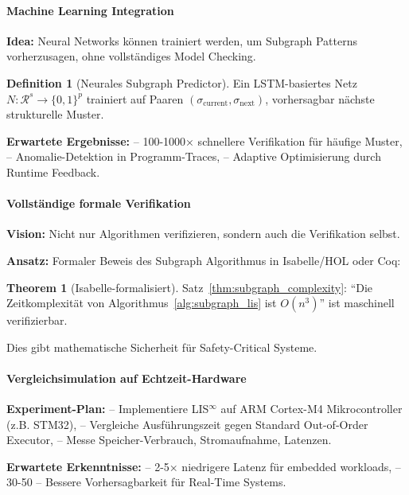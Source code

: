 \documentclass[a4paper,12pt]{article}
\theoremstyle{definition}
\newtheorem{theorem}{Theorem}
\newtheorem{definition}{Definition}
\begin{document}
\paragraph{Machine Learning Integration}

\textbf{Idea:} Neural Networks können trainiert werden, um Subgraph Patterns vorherzusagen, ohne vollständiges Model Checking.

\begin{definition}[Neurales Subgraph Predictor]
	Ein LSTM-basiertes Netz $N: \mathcal{R}^s \to \{0,1\}^p$ trainiert auf Paaren $(\sigma_{\text{current}}, \sigma_{\text{next}})$, vorhersagbar nächste strukturelle Muster.
\end{definition}

\textbf{Erwartete Ergebnisse:}
-- 100-1000× schnellere Verifikation für häufige Muster,
-- Anomalie-Detektion in Programm-Traces,
-- Adaptive Optimisierung durch Runtime Feedback.

\paragraph{Vollständige formale Verifikation}

\textbf{Vision:} Nicht nur Algorithmen verifizieren, sondern auch die Verifikation selbst.

\textbf{Ansatz:} Formaler Beweis des Subgraph Algorithmus in Isabelle/HOL oder Coq:

\begin{theorem}[Isabelle-formalisiert]
	Satz~\ref{thm:subgraph_complexity}: ``Die Zeitkomplexität von Algorithmus~\ref{alg:subgraph_lis} ist $O(n^3)$'' ist maschinell verifizierbar.
\end{theorem}

Dies gibt mathematische Sicherheit für Safety-Critical Systeme.

\paragraph{Vergleichsimulation auf Echtzeit-Hardware}

\textbf{Experiment-Plan:}
-- Implementiere LIS$^{\infty}$ auf ARM Cortex-M4 Mikrocontroller (z.B. STM32),
-- Vergleiche Ausführungszeit gegen Standard Out-of-Order Executor,
-- Messe Speicher-Verbrauch, Stromaufnahme, Latenzen.

\textbf{Erwartete Erkenntnisse:}
-- 2-5× niedrigere Latenz für embedded workloads,
-- 30-50%
-- Bessere Vorhersagbarkeit für Real-Time Systems.
\end{document}

